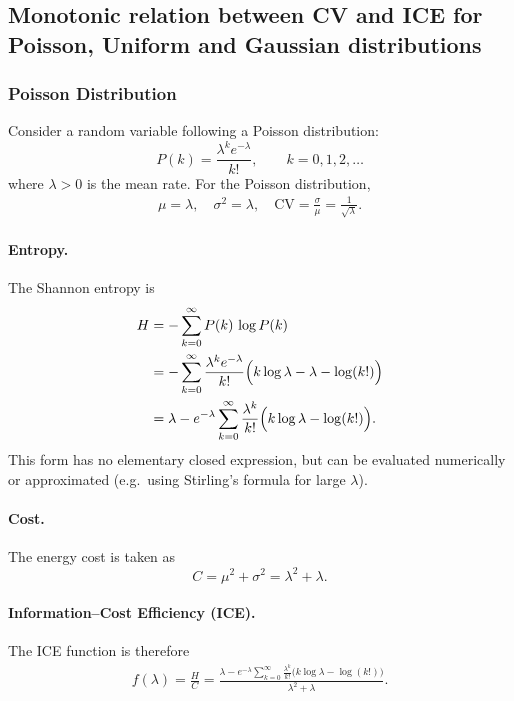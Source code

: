 \documentclass[11pt]{article}
\theoremstyle{remark}
\theoremstyle{definition}
\begin{document}
\subsection{Monotonic relation between CV and ICE for Poisson, Uniform and Gaussian distributions}
\subsubsection{Poisson Distribution}

Consider a random variable following a Poisson distribution:
\begin{equation}
    P(k) = \frac{\lambda^k e^{-\lambda}}{k!}, \qquad k=0,1,2,\dots
\end{equation}
where $\lambda>0$ is the mean rate. For the Poisson distribution, 
\begin{align}
\mu = \lambda, \quad \sigma^2 = \lambda, \quad \mathrm{CV}=\frac{\sigma}{\mu}=\frac{1}{\sqrt{\lambda}}.
\end{align}

\paragraph{Entropy.}
The Shannon entropy is
\begin{align}
H &= -\sum_{k=0}^\infty P(k)\,\log P(k) \notag \\
  &= -\sum_{k=0}^\infty \frac{\lambda^k e^{-\lambda}}{k!}
      \Big(k\log \lambda - \lambda - \log(k!)\Big) \notag \\
  &= \lambda - e^{-\lambda}\sum_{k=0}^\infty \frac{\lambda^k}{k!}
      \Big(k\log \lambda - \log(k!)\Big).
\label{eq:poisson-entropy}
\end{align}
This form has no elementary closed expression, but can be evaluated numerically or approximated (e.g.\ using Stirling’s formula for large $\lambda$).

\paragraph{Cost.}
The energy cost is taken as
\begin{equation}
C = \mu^2 + \sigma^2 = \lambda^2 + \lambda.
\label{eq:poisson-cost}
\end{equation}

\paragraph{Information–Cost Efficiency (ICE).}
The ICE function is therefore
\begin{align}
f(\lambda) = \frac{H}{C}
= \frac{\lambda - e^{-\lambda}\sum_{k=0}^\infty \frac{\lambda^k}{k!}
\big(k\log \lambda - \log(k!)\big)}{\lambda^2+\lambda}.
\label{eq:poisson-ice}
\end{align}
\end{document}
